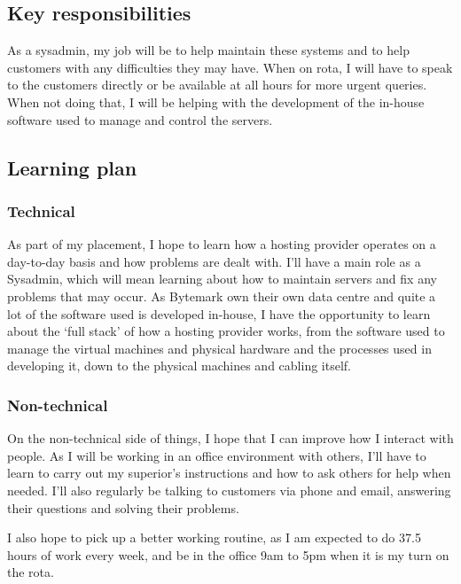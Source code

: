 \documentclass[12pt,a4paper]{article}
\begin{document}
\subsection*{Key responsibilities}
	As a sysadmin, my job will be to help maintain these systems and to help
	customers with any difficulties they may have. When on rota, I will have to
	speak to the customers directly or be available at all hours for more
	urgent queries. When not doing that, I will be helping with the development
	of the in-house software used to manage and control the servers.

\subsection*{Learning plan}
\subsubsection*{Technical}
	As part of my placement, I hope to learn how a hosting provider operates on
	a day-to-day basis and how problems are dealt with. I'll have a main role
	as a Sysadmin, which will mean learning about how to maintain servers and
	fix any problems that may occur.
	As Bytemark own their own data centre and quite a lot of the software used
	is developed in-house, I have the opportunity to learn about the
	`full stack' of how a hosting provider works, from the software used to
	manage the virtual machines and physical hardware and the processes used in
	developing it, down to the physical machines and cabling itself.

\subsubsection*{Non-technical}
	On the non-technical side of things, I hope that I can improve how I
	interact with people. As I will be working in an office environment with
	others, I'll have to learn to carry out my superior's instructions and how
	to ask others for help when needed. I'll also regularly be talking to
	customers via phone and email, answering their questions and solving their
	problems.

	I also hope to pick up a better working routine, as I am expected to do
	37.5 hours of work every week, and be in the office 9am to 5pm when it is
	my turn on the rota.
\end{document}
